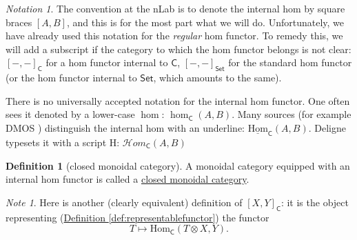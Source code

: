 \documentclass[a4paper,10pt]{scrreprt}
\newcommand{\defn}[1]{\ul{#1}}
\newcommand{\Hom}{\mathrm{Hom}}
\theoremstyle{definition}
\newtheorem{definition}{Definition}[section]
\theoremstyle{plain}
\theoremstyle{remark}
\newtheorem{note}{Note}[section]
\newtheorem{notation}{Notation}[section]
\begin{document}
\begin{notation}
  The convention at the nLab is to denote the internal hom by square braces $[A,B]$, and this is for the most part what we will do. Unfortunately, we have already used this notation for the \emph{regular} hom functor. To remedy this, we will add a subscript if the category to which the hom functor belongs is not clear: $[-,-]_{\mathsf{C}}$ for a hom functor internal to $\mathsf{C}$, $[-,-]_{\mathsf{Set}}$ for the standard hom functor (or the hom functor internal to $\mathsf{Set}$, which amounts to the same). 

  There is no universally accepted notation for the internal hom functor. One often sees it denoted by a lower-case $\hom$: $\hom_{\mathsf{C}}(A, B)$. Many sources (for example DMOS \cite{DMOS}) distinguish the internal hom with an underline: $\underline{\Hom}_{\mathsf{C}}(A, B)$. Deligne typesets it with a script H: $\mathscr{H}om_{\mathsf{C}}(A, B)$
\end{notation}

\begin{definition}[closed monoidal category]
  \label{def:closedmonoidalcategory}
  A monoidal category equipped with an internal hom functor is called a \defn{closed monoidal category}.
\end{definition}

\begin{note}
  Here is another (clearly equivalent) definition of $[X, Y]_{\mathsf{C}}$: it is the object representing (\hyperref[def:representablefunctor]{Definition \ref*{def:representablefunctor}}) the functor
  \begin{equation*}
    T \mapsto \Hom_\mathsf{C}(T \otimes X, Y).
  \end{equation*}
\end{note}
\end{document}
